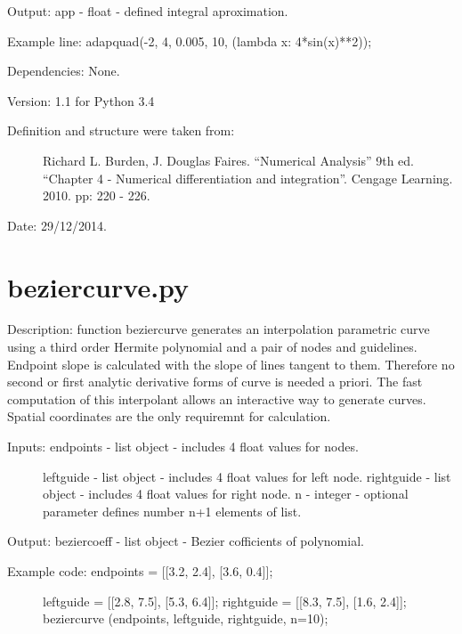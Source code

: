 \documentclass[letterpaper,10pt,oneside]{sphinxmanual}
\theoremstyle{plain}%
\theoremstyle{definition}%
\theoremstyle{remark}%
\begin{document}
Output: app - float - defined integral aproximation.

Example line: adapquad(-2, 4, 0.005, 10, (lambda x: 4*sin(x)**2));

Dependencies: None.

Version: 1.1 for Python 3.4
\begin{description}
\item[{Definition and structure were taken from:}] \leavevmode
Richard L. Burden, J. Douglas Faires. ``Numerical Analysis'' 9th ed.
``Chapter 4 - Numerical differentiation and integration''. 
Cengage Learning. 2010. pp: 220 - 226.

\end{description}




Date: 29/12/2014.


\section{beziercurve.py}
\label{code:beziercurve-py}\label{code:module-beziercurve}
Description: function beziercurve generates an interpolation parametric
curve using a third order Hermite polynomial and a pair of nodes and
guidelines. Endpoint slope is calculated with the slope of lines
tangent to them. Therefore no second or first analytic derivative 
forms of curve is needed a priori. The fast computation of this interpolant
allows an interactive way to generate curves. Spatial coordinates are
the only requiremnt for calculation.
\begin{description}
\item[{Inputs: endpoints - list object - includes 4 float values for nodes.}] \leavevmode
leftguide - list object - includes 4 float values for left node.
rightguide - list object - includes 4 float values for right node.
n - integer - optional parameter defines number n+1 elements of list.

\end{description}

Output: beziercoeff - list object - Bezier cofficients of polynomial.
\begin{description}
\item[{Example code: endpoints = {[}{[}3.2, 2.4{]}, {[}3.6, 0.4{]}{]};}] \leavevmode
leftguide = {[}{[}2.8, 7.5{]}, {[}5.3, 6.4{]}{]};
rightguide = {[}{[}8.3, 7.5{]}, {[}1.6, 2.4{]}{]};
beziercurve (endpoints, leftguide, rightguide, n=10);

\end{description}
\end{document}
